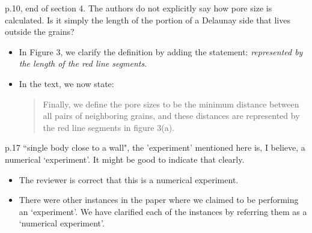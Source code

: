 \documentclass[11pt]{article}
\newcommand{\comment}[1]{{\color{blue} #1}}
\begin{document}
\noindent
\comment{p.10, end of section 4.  The authors do not explicitly say how
pore size is calculated.  Is it simply the length of the portion of a
Delaunay side that lives outside the grains?}
\begin{itemize}
 \item In Figure 3, we clarify the definition by adding the statement:
    {\em represented by the length of the red line segments}.
  \item In the text, we now state:
    \begin{quotation}
    \noindent
      Finally, we define the pore sizes to be the minimum distance
      between all pairs of neighboring grains, and these distances are
      represented by the red line segments in figure 3(a).
    \end{quotation}
\end{itemize}

\noindent
\comment{p.17 ``single body close to a wall", the 'experiment' mentioned
here is, I believe, a numerical `experiment'.  It might be good to
indicate that clearly.}
\begin{itemize}
  \item The reviewer is correct that this is a numerical experiment.

  \item There were other instances in the paper where we claimed to be
    performing an `experiment'. We have clarified each of the instances
    by referring them as a `numerical experiment'.
\end{itemize}
\end{document}
